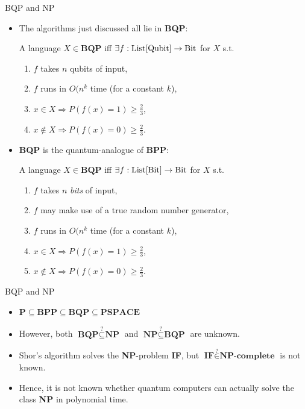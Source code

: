 \documentclass{beamer}
\newcommand{\mt}[1]{\textnormal{#1}}
\begin{document}
\begin{frame}{BQP and NP}
	\begin{itemize}
    	\item The algorithms just discussed all lie in \textbf{BQP}:
        
        \begin{definition}
        	A language $X \in \textbf{BQP}$ iff $\exists f : \mt{List}[\mt{Qubit}] \rightarrow \mt{Bit}$ for $X$ s.t.
            \begin{enumerate}
            	\item $f$ takes $n$ qubits of input,
            	\item $f$ runs in $O(n^k$ time (for a constant $k$),
                \item $x \in X \Rightarrow P(f(x) = 1) \geq \frac{2}{3}$,
                \item $x \notin X \Rightarrow P(f(x) = 0) \geq \frac{2}{3}$.
            \end{enumerate}
        \end{definition}
        
        \item \textbf{BQP} is the quantum-analogue of \textbf{BPP}:
        
                \begin{definition}
        	A language $X \in \textbf{BQP}$ iff $\exists f : \mt{List}[\mt{Bit}] \rightarrow \mt{Bit}$ for $X$ s.t.
            \begin{enumerate}
            	\item $f$ takes $n$ {\em bits} of input,
                \item $f$ may make use of a true random number generator,
            	\item $f$ runs in $O(n^k$ time (for a constant $k$),
                \item $x \in X \Rightarrow P(f(x) = 1) \geq \frac{2}{3}$,
                \item $x \notin X \Rightarrow P(f(x) = 0) \geq \frac{2}{3}$.
            \end{enumerate}
        \end{definition}
    \end{itemize}
\end{frame}

\begin{frame}{BQP and NP}
	\begin{itemize}
    	\item $\textbf{P} \subseteq \textbf{BPP} \subseteq \textbf{BQP} \subseteq \textbf{PSPACE}$
        \item However, both $\textbf{BQP} \stackrel{?}{\subseteq} \textbf{NP}$ and $\textbf{NP} \stackrel{?}{\subseteq} \textbf{BQP}$ are unknown.
        \item Shor's algorithm solves the \textbf{NP}-problem \textbf{IF}, but $\textbf{IF} \stackrel{?}{\in} \textbf{NP-complete}$ is not known.
        \item Hence, it is not known whether quantum computers can actually solve the class \textbf{NP} in polynomial time.
    \end{itemize}
\end{frame}
\end{document}
